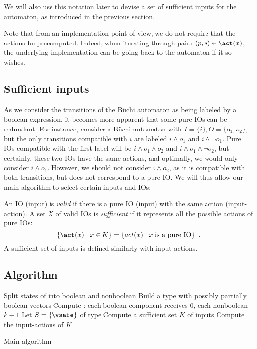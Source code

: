 \documentclass[sigconf,screen]{acmart}
\begin{document}
We will also use this notation later to devise a set of sufficient inputs for
the automaton, as introduced in the previous section.

Note that from an implementation point of view, we do not require that the
actions be precomputed.  Indeed, when iterating through pairs
\((p, q) \in \act(x)\), the underlying implementation can be going back to the
automaton if it so wishes.

\subsection{Sufficient inputs}

As we consider the transitions of the Büchi automaton as being labeled by a
boolean expression, it becomes more apparent that some pure IOs can be
redundant.  For instance, consider a Büchi automaton with
\(I = \{i\}, O = \{o_1, o_2\}\), but the only transitions compatible with \(i\) are
labeled \(i \land o_1\) and \(i \land \neg o_1\).  Pure IOs compatible with the first
label will be \(i \land o_1 \land o_2\) and \(i \land o_1 \land \neg o_2\), but
certainly, these two IOs have the same actions, and optimally, we would only
consider \(i \land o_1\).  However, we should not consider \(i \land o_2\), as it is
compatible with both transitions, but does not correspond to a pure IO.  We will
thus allow our main algorithm to select certain inputs and IOs:
\begin{definition}
  An IO (\resp input) is \emph{valid} if there is a pure IO (\resp input) with
  the same action (\resp input-action).  A set \(X\) of valid IOs is
  \emph{sufficient} if it represents all the possible actions of pure IOs:
  \[\{\act(x) \mid x \in K\} = \{act(x) \mid x \text{ is a pure IO}\}\enspace.\]
  A sufficient set of inputs is defined similarly with input-actions.
\end{definition}

\subsection{Algorithm}

\begin{algorithm}

\BlankLine

Split states of \cA into boolean and nonboolean\;
Build a type \Antichain with possibly partially boolean vectors\;
Compute \vsafe: each boolean component receives 0, each nonboolean \(k - 1\)\;
Let \(S = \{\vsafe\}\) of type \Antichain\;
Compute a sufficient set \(K\) of  inputs\;
Compute the input-actions of \(K\)\;
\caption{Main algorithm}\label{main_algo}
\end{algorithm}
\end{document}
